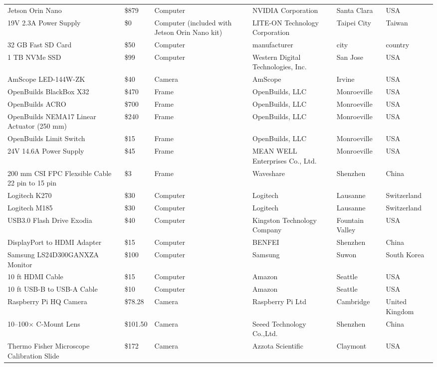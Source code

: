 \begin{longtable}{|p{4cm}|p{2cm}|p{2cm}|p{2.5cm}|p{2.5cm}|p{2.5cm}|}
Jetson Orin Nano & \$879 & Computer & NVIDIA Corporation & Santa Clara & USA \\
19V 2.3A Power Supply & \$0 & Computer (included with Jetson Orin Nano kit) & LITE-ON Technology Corporation & Taipei City & Taiwan \\
32 GB Fast SD Card & \$50 & Computer & manufacturer & city & country \\
1 TB NVMe SSD & \$99 & Computer & Western Digital Technologies, Inc. & San Jose & USA \\
AmScope LED-144W-ZK & \$40 & Camera & AmScope  & Irvine  & USA \\
OpenBuilds BlackBox X32 & \$470 & Frame & OpenBuilds, LLC & Monroeville & USA \\
OpenBuilds ACRO & \$700 & Frame & OpenBuilds, LLC & Monroeville & USA \\
OpenBuilds NEMA17 Linear Actuator (250 mm) & \$240 & Frame & OpenBuilds, LLC & Monroeville & USA \\
OpenBuilds Limit Switch & \$15 & Frame & OpenBuilds, LLC & Monroeville & USA \\
24V 14.6A Power Supply & \$45 & Frame & MEAN WELL Enterprises Co., Ltd. & Monroeville & USA \\
200 mm CSI FPC Flexsible Cable 22 pin to 15 pin & \$3 & Frame & Waveshare & Shenzhen & China \\
Logitech K270 & \$30 & Computer & Logitech & Lausanne & Switzerland \\
Logitech M185 & \$30 & Computer & Logitech & Lausanne & Switzerland \\
USB3.0 Flash Drive Exodia & \$40 & Computer & Kingston Technology Company & Fountain Valley & USA \\
DisplayPort to HDMI Adapter & \$15 & Computer & BENFEI & Shenzhen & China \\
Samsung LS24D300GANXZA Monitor & \$100 & Computer & Samsung & Suwon & South Korea \\
10 ft HDMI Cable & \$15 & Computer & Amazon & Seattle & USA \\
10 ft USB-B to USB-A Cable & \$10 & Computer & Amazon & Seattle & USA \\
Raspberry Pi HQ Camera & \$78.28 & Camera & Raspberry Pi Ltd & Cambridge & United Kingdom \\
10--100$\times$ C-Mount Lens & \$101.50 & Camera & Seeed Technology Co.,Ltd. & Shenzhen & China \\
Thermo Fisher Microscope Calibration Slide & \$172 & Camera & Azzota Scientific & Claymont & USA \\

\end{longtable}
